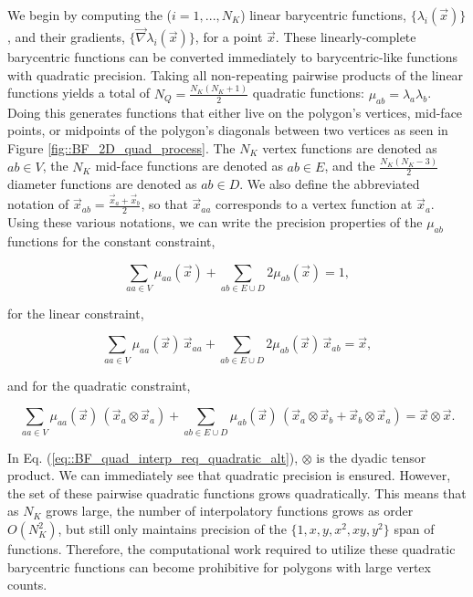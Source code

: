 We begin by computing the ($i=1,...,N_K$) linear barycentric functions, $\{ \lambda_i (\vec{x}) \}$, and their gradients, $\{ \vec{\nabla} \lambda_i (\vec{x}) \}$, for a point $\vec{x}$. These linearly-complete barycentric functions can be converted immediately to barycentric-like functions with quadratic precision. Taking all non-repeating pairwise products of the linear functions yields a total of $N_Q=\frac{N_K(N_K+1)}{2}$ quadratic functions: $\mu_{ab} = \lambda_a \lambda_b$. Doing this generates functions that either live on the polygon's vertices, mid-face points, or midpoints of the polygon's diagonals between two vertices as seen in Figure \ref{fig::BF_2D_quad_process}. The $N_K$ vertex functions are denoted as $ab \in V$, the $N_K$ mid-face functions are denoted as $ab \in E$, and the $\frac{N_K(N_K-3)}{2}$ diameter functions are denoted as $ab \in D$. We also define the abbreviated notation of $\vec{x}_{ab} = \frac{\vec{x}_a + \vec{x}_b}{2}$, so that $\vec{x}_{aa}$ corresponds to a vertex function at $\vec{x}_a$. Using these various notations, we can write the precision properties of the $\mu_{ab}$ functions for the constant constraint,

\begin{equation}
\label{eq::BF_quad_interp_req_constant_alt}
\sum_{aa \in V}  \mu_{aa} (\vec{x}) + \sum_{ab \in E \cup D} 2 \mu_{ab} (\vec{x})  = 1 ,
\end{equation}

\noindent for the linear constraint,

\begin{equation}
\label{eq::BF_quad_interp_req_linear_alt}
\sum_{aa \in V}  \mu_{aa} (\vec{x}) \, \vec{x}_{aa} +  \sum_{ab \in E \cup D} 2  \mu_{ab} (\vec{x}) \, \vec{x}_{ab} = \vec{x} ,
\end{equation}

\noindent and for the quadratic constraint,

\begin{equation}
\label{eq::BF_quad_interp_req_quadratic_alt}
\sum_{aa \in V}  \mu_{aa} (\vec{x}) \, \left( \vec{x}_a \otimes \vec{x}_a \right) +  \sum_{ab \in E \cup D}   \mu_{ab} (\vec{x}) \, \left( \vec{x}_a \otimes \vec{x}_b + \vec{x}_b \otimes \vec{x}_a \right)   =  \vec{x} \otimes \vec{x} .
\end{equation}


\noindent In Eq. (\ref{eq::BF_quad_interp_req_quadratic_alt}), $\otimes$ is the dyadic tensor product. We can immediately see that quadratic precision is ensured. However, the set of these pairwise quadratic functions grows quadratically. This means that as $N_K$ grows large, the number of interpolatory functions grows as order $O(N_K^2)$, but still only maintains precision of the $\{ 1, x, y, x^2, xy, y^2 \}$ span of functions. Therefore, the computational work required to utilize these quadratic barycentric functions can become prohibitive for polygons with large vertex counts.

